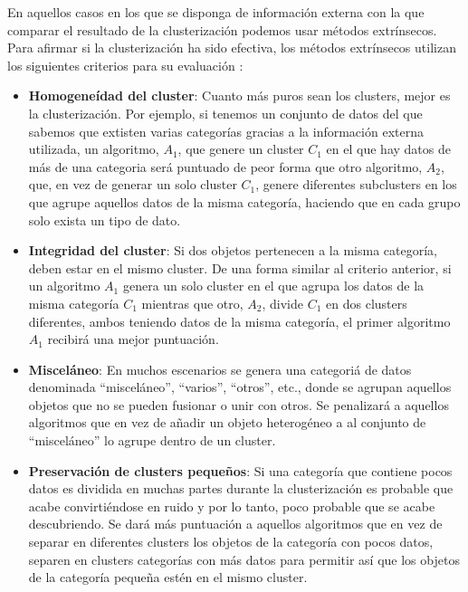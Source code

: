 \documentclass[10pt, a4paper]{article}
\begin{document}
En aquellos casos en los que se disponga de información externa con la que comparar el resultado de la clusterización podemos usar métodos extrínsecos. Para afirmar si la clusterización ha sido efectiva, los métodos extrínsecos utilizan los siguientes criterios para su evaluación \cite{LIBRO}:

\begin{itemize}
  \item \textbf{Homogeneídad del cluster}: Cuanto más puros sean los clusters, mejor es la clusterización. Por ejemplo, si tenemos un conjunto de datos del que sabemos que extisten varias categorías gracias a la información externa utilizada, un algoritmo, $A_1$, que genere un cluster $C_1$ en el que hay datos de más de una categoria será puntuado de peor forma que otro algoritmo, $A_2$, que, en vez de generar un solo cluster $C_1$, genere diferentes subclusters en los que agrupe aquellos datos de la misma categoría, haciendo que en cada grupo solo exista un tipo de dato.
  
  \item \textbf{Integridad del cluster}: Si dos objetos pertenecen a la misma categoría, deben estar en el mismo cluster. De una forma similar al criterio anterior, si un algoritmo $A_1$ genera un solo cluster en el que agrupa los datos de la misma categoría $C_1$ mientras que otro, $A_2$, divide $C_1$ en dos clusters diferentes, ambos teniendo datos de la misma categoría, el primer algoritmo $A_1$ recibirá una mejor puntuación.
  
  \item \textbf{Misceláneo}: En muchos escenarios se genera una categoriá de datos denominada ``misceláneo'', ``varios'', ``otros'', etc., donde se agrupan aquellos objetos que no se pueden fusionar o unir con otros. Se penalizará a aquellos algoritmos que en vez de añadir un objeto heterogéneo a al conjunto de ``misceláneo'' lo agrupe dentro de un cluster.
  
  \item \textbf{Preservación de clusters pequeños}: Si una categoría que contiene pocos datos es dividida en muchas partes durante la clusterización es probable que acabe convirtiéndose en ruido y por lo tanto, poco probable que se acabe descubriendo. Se dará más puntuación a aquellos algoritmos que en vez de separar en diferentes clusters los objetos de la categoría con pocos datos, separen en clusters categorías con más datos para permitir así que los objetos de la categoría pequeña estén en el mismo cluster. 
   
\end{itemize}
\end{document}
